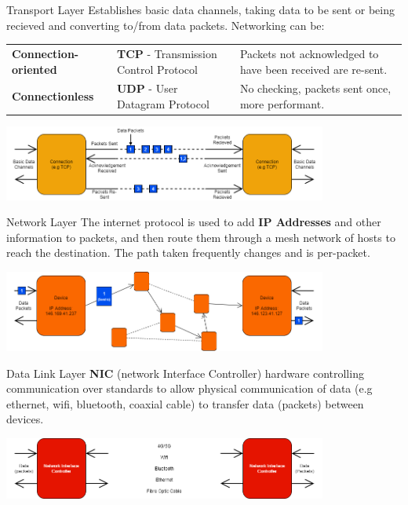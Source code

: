 \begin{definitionbox}{Transport Layer}
    Establishes basic data channels, taking data to be sent or being recieved and converting to/from data packets. Networking can be:
    \begin{tabular}{l l l}
        \textbf{Connection-oriented} & \textbf{TCP} - Transmission Control Protocol & Packets not acknowledged to have been received are re-sent. \\
        \textbf{Connectionless}      & \textbf{UDP} - User Datagram Protocol        & No checking, packets sent once, more performant.            \\
    \end{tabular}
    \begin{center}
        \includegraphics[width=0.8\textwidth]{basic_concepts_and_osi/images/transport layer.png}
    \end{center}
\end{definitionbox}

\begin{definitionbox}{Network Layer}
    The internet protocol is used to add \textbf{IP Addresses} and other information to packets, and then route them through a mesh network of hosts to reach the destination. The path taken frequently changes and is per-packet.
    \begin{center}
        \includegraphics[width=0.8\textwidth]{basic_concepts_and_osi/images/network layer.png}
    \end{center}
\end{definitionbox}

\begin{definitionbox}{Data Link Layer}
    \textbf{NIC} (network Interface Controller) hardware controlling communication over standards to allow physical communication of data (e.g ethernet, wifi, bluetooth, coaxial cable) to transfer data (packets) between devices.
    \begin{center}
        \includegraphics[width=0.8\textwidth]{basic_concepts_and_osi/images/data link layer.png}
    \end{center}
\end{definitionbox}

